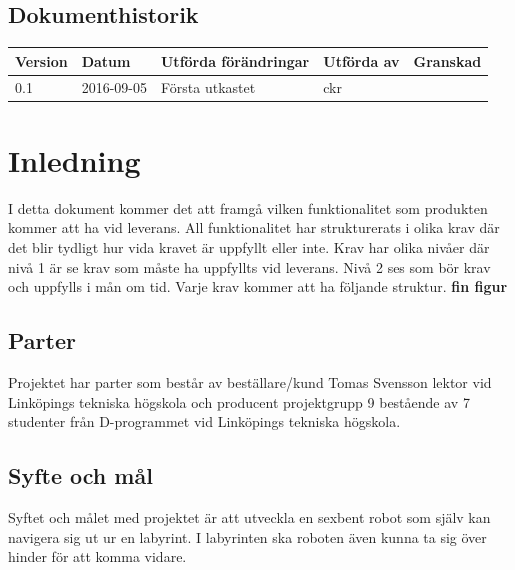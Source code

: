 \documentclass[a4paper,titlepage,12pt]{article}
\begin{document}
\begin{center}
		
		\newpage



		\section*{Dokumenthistorik}
		\begin{table}[h]
			\begin{tabular}[pos]{| l | l | l | l | l |}
				\hline
				\textbf{Version} & \textbf{Datum} & \textbf{Utförda förändringar} 
				& \textbf{Utförda av} & \textbf{Granskad} \\ \hline

				0.1 & 2016-09-05 & Första utkastet & ckr & \\ \hline

			\end{tabular}
		\end{table}

	\end{center}


	\newpage

	\section{Inledning}
	I detta dokument kommer det att framgå vilken funktionalitet som produkten kommer 
	att ha vid leverans. All funktionalitet har strukturerats i olika krav där det 
	blir tydligt hur vida kravet är uppfyllt eller inte. Krav har olika nivåer där
	nivå 1 är se krav som måste ha uppfyllts vid leverans. Nivå 2 ses som bör krav 
	och uppfylls i mån om tid. Varje krav kommer att ha följande struktur. 
	\textbf{fin figur}

	\subsection{Parter}
	Projektet har parter som består av beställare/kund Tomas Svensson lektor vid 
	Linköpings tekniska högskola och producent projektgrupp 9 bestående av 7 
	studenter från D-programmet vid Linköpings tekniska högskola. 
	\subsection{Syfte och mål}
	Syftet och målet med projektet är att utveckla en sexbent robot som själv
	kan navigera sig ut ur en labyrint. I labyrinten ska roboten även kunna ta 
	sig över hinder för att komma vidare. 
\end{document}
